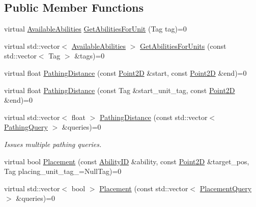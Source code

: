 \subsection*{Public Member Functions}
\begin{DoxyCompactItemize}
\item 
virtual \hyperlink{structsc2_1_1_available_abilities}{Available\+Abilities} \hyperlink{classsc2_1_1_query_interface_a5e06452df74dc9cf0c8cafe8fe42e85b}{Get\+Abilities\+For\+Unit} (Tag tag)=0
\item 
virtual std\+::vector$<$ \hyperlink{structsc2_1_1_available_abilities}{Available\+Abilities} $>$ \hyperlink{classsc2_1_1_query_interface_acf20e12a5b9b8ffb419384df58db023f}{Get\+Abilities\+For\+Units} (const std\+::vector$<$ Tag $>$ \&tags)=0
\item 
virtual float \hyperlink{classsc2_1_1_query_interface_adf72c7556e59e82e231d9c58bd093546}{Pathing\+Distance} (const \hyperlink{structsc2_1_1_point2_d}{Point2D} \&start, const \hyperlink{structsc2_1_1_point2_d}{Point2D} \&end)=0
\item 
virtual float \hyperlink{classsc2_1_1_query_interface_a1a7216c7ad37273dc54e12a92fee7a64}{Pathing\+Distance} (const Tag \&start\+\_\+unit\+\_\+tag, const \hyperlink{structsc2_1_1_point2_d}{Point2D} \&end)=0
\item 
\mbox{\label{classsc2_1_1_query_interface_ae23848466df99bfb7c3da9fbabc7f47b}} 
virtual std\+::vector$<$ float $>$ \hyperlink{classsc2_1_1_query_interface_ae23848466df99bfb7c3da9fbabc7f47b}{Pathing\+Distance} (const std\+::vector$<$ \hyperlink{structsc2_1_1_query_interface_1_1_pathing_query}{Pathing\+Query} $>$ \&queries)=0
\begin{DoxyCompactList}\small\item\em Issues multiple pathing queries. \end{DoxyCompactList}\item 
virtual bool \hyperlink{classsc2_1_1_query_interface_ae78a9660fc9f03b1676bacf47c9a9180}{Placement} (const \hyperlink{classsc2_1_1_s_c2_type}{Ability\+ID} \&ability, const \hyperlink{structsc2_1_1_point2_d}{Point2D} \&target\+\_\+pos, Tag placing\+\_\+unit\+\_\+tag\+\_\+=Null\+Tag)=0
\item 
virtual std\+::vector$<$ bool $>$ \hyperlink{classsc2_1_1_query_interface_a470e79785e2ffdb1a5c4636c8a070601}{Placement} (const std\+::vector$<$ \hyperlink{structsc2_1_1_query_interface_1_1_placement_query}{Placement\+Query} $>$ \&queries)=0
\end{DoxyCompactItemize}


